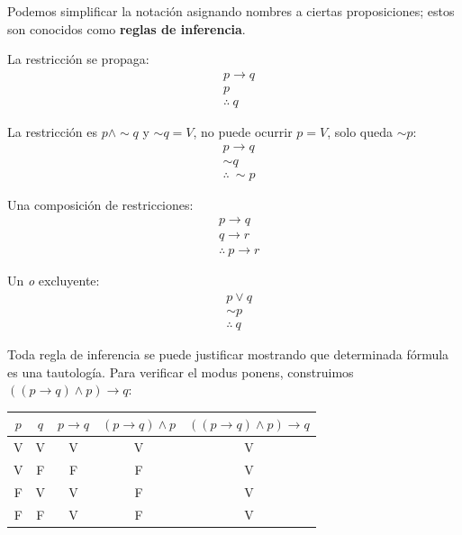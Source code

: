 \documentclass{book}
\begin{document}
  Podemos simplificar la notación asignando nombres a ciertas proposiciones; estos son
  conocidos como \textbf{reglas de inferencia}.
    \begin{definition}[title=Modus Ponens]
    La restricción se propaga:
    \begin{align}
    &p \to q \nonumber\\
    &p \nonumber\\
    &\therefore\ q \nonumber
    \end{align}
    \end{definition}
    \begin{definition}[title=Modus Tollens]
    La restricción es $p \land \sim q$ y $\sim q = V$, no puede ocurrir $p = V$,
    solo queda $\sim p$:
    \begin{align}
    &p \to q \nonumber\\
    &\sim q \nonumber\\
    &\therefore\ \sim p \nonumber
    \end{align}
    \end{definition}
    \begin{definition}[title=Silogismo Hipotético]
    Una composición de restricciones:
    \begin{align}
    &p \to q \nonumber\\
    &q \to r \nonumber\\
    &\therefore\ p \to r \nonumber
    \end{align}
    \end{definition}
    \begin{definition}[title=Silogismo Disyuntivo]
    Un \textit{o} excluyente:
    \begin{align}
    &p \lor q \nonumber\\
    &\sim p \nonumber\\
    &\therefore\ q \nonumber
    \end{align}
    \end{definition}
  
  Toda regla de inferencia se puede justificar mostrando que determinada fórmula es una
  tautología. Para verificar el modus ponens, construimos $((p \to q) \land p) \to q$:
  
  \begin{tabular}{c|c|c|c|c}
  $p$ & $q$ & $p \to q$ & $(p \to q) \land p$ & $((p \to q) \land p) \to q$ \\
  \hline
  V & V & V & V & V \\
  V & F & F & F & V \\
  F & V & V & F & V \\
  F & F & V & F & V \\
  \end{tabular}
  
\end{document}
